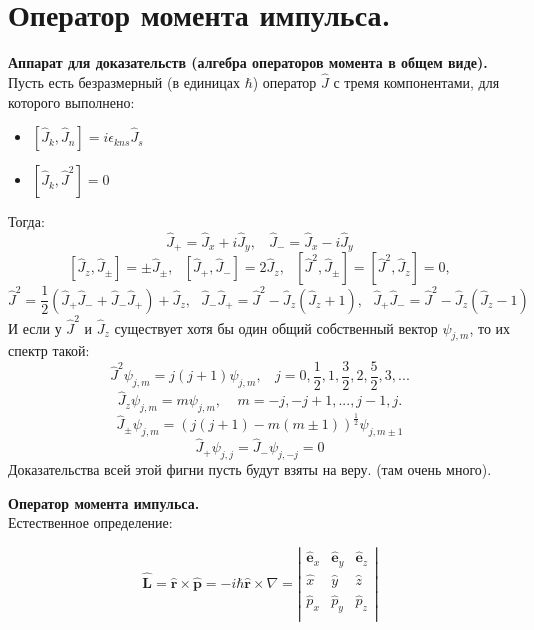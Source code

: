 \section{Оператор момента импульса.}
	\begin{scriptsize}
	\begin{spacing}{0.3}
		\noindent \textbf{Аппарат для доказательств (алгебра операторов момента в общем виде).}\\
		Пусть есть безразмерный (в единицах $\hbar$) оператор $\hat{J}$ с тремя компонентами, для которого выполнено:
		\begin{itemize}
			\item $[\hat{J}_k, \hat{J}_n] = i\epsilon_{kns}\hat{J}_s $
			\item $[\hat{J}_k, \hat{J}^2] = 0$
		\end{itemize}
		Тогда:
		$$
			\hat{J}_{+} = \hat{J}_x+i\hat{J}_y, \ \ \ \ \hat{J}_{-} = \hat{J}_x - i\hat{J}_y
		$$
		$$
			[\hat{J}_z, \hat{J}_{\pm}] = \pm \hat{J}_{\pm}, \ \ \ [\hat{J}_{+}, \hat{J}_{-}] = 2\hat{J}_z, \ \ \ [\hat{J}^2, \hat{J}_{\pm}] = [\hat{J}^2, \hat{J}_z] = 0, 
		$$
		$$
			\hat{J}^2 = \frac{1}{2}(\hat{J}_{+}\hat{J}_{-} + \hat{J}_{-}\hat{J}_{+}) + \hat{J}_z, \ \ \ \hat{J}_{-}\hat{J}_{+} = \hat{J}^2 - \hat{J}_z(\hat{J}_z + 1), \ \ \ \hat{J}_{+}\hat{J}_{-} = \hat{J}^2 - \hat{J}_z(\hat{J}_z - 1) 
		$$
		И если у $\hat{J}^2$ и $\hat{J}_z$ существует хотя бы один общий собственный вектор $\psi_{j,m}$, то их спектр такой:
		$$
			\hat{J}^2 \psi_{j,m} = j(j + 1)\psi_{j,m}, \ \ \ \ j = 0, \frac{1}{2}, 1, \frac{3}{2}, 2, \frac{5}{2}, 3, ...
		$$
		$$
			\hat{J}_z \psi_{j,m} = m \psi_{j,m}, \ \ \ \ \ m = -j, -j + 1, ... , j - 1, j.
		$$
		$$
			\hat{J}_{\pm} \psi_{j,m} = (j(j + 1) - m (m \pm 1))^{\frac{1}{2}} \psi_{j,m\pm1}
		$$
		$$
			\hat{J}_{+}\psi_{j,j}= \hat{J}_{-}\psi_{j,-j} = 0
		$$
		Доказательства всей этой фигни пусть будут взяты на веру. (там очень много).
	\end{spacing}
	\end{scriptsize}
	\bigskip
	\noindent \textbf{Оператор момента импульса.}\\
	Естественное определение:\\
	\begin{minipage}{0.6\textwidth}
		$$
			\hat{\textbf{L}} = \hat{\textbf{r}} \times \hat{\textbf{p}} = -i\hbar \hat{\textbf{r}} \times \nabla = \left| 
			\begin{array}{ccc}
				\hat{\textbf{e}}_x & \hat{\textbf{e}}_y & \hat{\textbf{e}}_z \\
				\hat{x} & \hat{y} & \hat{z} \\
				\hat{p}_x & \hat{p}_y & \hat{p}_z \\
			\end{array} 
			\right| 
		$$
	\end{minipage}
